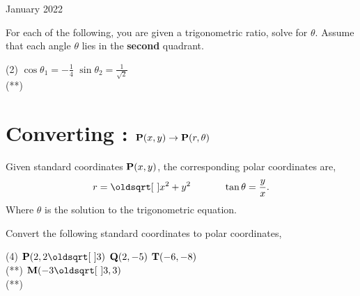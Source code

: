 \documentclass[12pt,oneside]{book} %
\begin{document}
\begin{lec}{January 2022}
    \begin{ex}
      For each of the following, you are given a trigonometric ratio, solve for $\theta$. 
      Assume that each angle  $\theta$ lies in the \textbf{second} quadrant.
        \begin{tasks}(2)
           \task $\cos \theta_1 = -\frac{1}{4}$
           \task $\sin \theta_2 = \frac{1}{\sqrt{2}} $ \\ (**)
        \end{tasks}
    \end{ex}

   \section{Converting :  $\vb P(x,y) \rightarrow \vb P(r, \theta)$}

   \begin{thrm}
     Given standard coordinates $\vb P(x,y)$, the corresponding polar coordinates are,
    \[
        r = \sqrt{x^2 + y^2} \hspace*{1.2cm} \tan \theta = \frac{y}{x}
   .\]
   Where $\theta$ is the solution to the trigonometric equation.
   \end{thrm}

   \begin{ex}
     Convert the following standard coordinates to polar coordinates,
    \begin{tasks}(4)
       \task $\vb P\left(2, 2\sqrt{3}\right)$
       \task $\vb Q(2, -5)$
       \task $\vb T\left(-6,-8 \right)$ \\ (**)
       \task $\vb M\left(-3\sqrt{3}, 3\right)$ \\ (**)
    \end{tasks}
   \end{ex}


  

	\end{lec}
\end{document}
